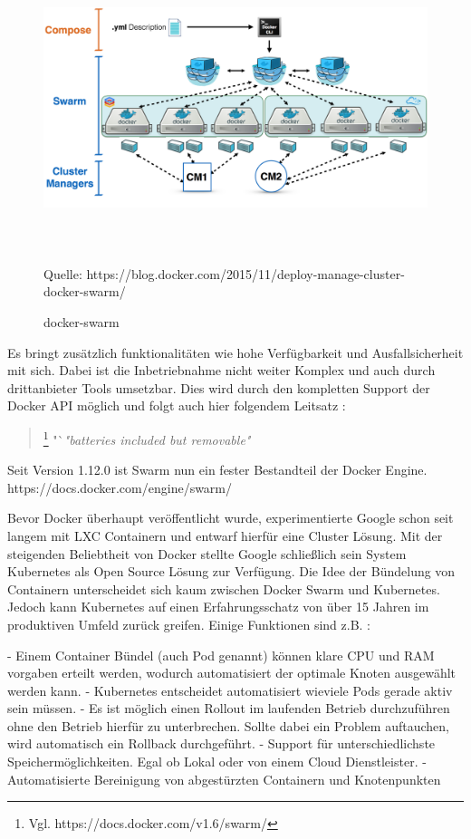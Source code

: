 \documentclass[12pt,toc=bib,toc=listof]{scrreprt}
\begin{document}
\begin{figure}
	\centering
	\caption{docker-swarm}
	\includegraphics[width=15cm, height=9cm, scale=0.3]{docker-swarm.png}
	Quelle: https://blog.docker.com/2015/11/deploy-manage-cluster-docker-swarm/
\end{figure}

Es bringt zusätzlich funktionalitäten wie hohe Verfügbarkeit und Ausfallsicherheit mit sich.
Dabei ist die Inbetriebnahme nicht weiter Komplex und auch durch drittanbieter Tools umsetzbar.
Dies wird durch den kompletten Support der Docker API möglich und folgt auch hier folgendem Leitsatz :

\begin{quote}
	\footnote[1]{Vgl. https://docs.docker.com/v1.6/swarm/}
	"`\textit{"batteries included but removable"}
\end{quote}

Seit Version 1.12.0 ist Swarm nun ein fester Bestandteil der Docker Engine.
https://docs.docker.com/engine/swarm/

Bevor Docker überhaupt veröffentlicht wurde, experimentierte Google schon seit langem mit LXC Containern und entwarf hierfür eine Cluster Lösung.
Mit der steigenden Beliebtheit von Docker stellte Google schließlich sein System Kubernetes als Open Source Lösung zur Verfügung.
Die Idee der Bündelung von Containern unterscheidet sich kaum zwischen Docker Swarm und Kubernetes.
Jedoch kann Kubernetes auf einen Erfahrungsschatz von über 15 Jahren im produktiven Umfeld zurück greifen.
Einige Funktionen sind z.B. :

- Einem Container Bündel (auch Pod genannt) können klare CPU und RAM vorgaben erteilt werden, wodurch automatisiert der optimale Knoten ausgewählt werden kann.
- Kubernetes entscheidet automatisiert wieviele Pods gerade aktiv sein müssen.
- Es ist möglich einen Rollout im laufenden Betrieb durchzuführen ohne den Betrieb hierfür zu unterbrechen. Sollte dabei ein Problem auftauchen, wird automatisch ein Rollback durchgeführt.
- Support für unterschiedlichste Speichermöglichkeiten. Egal ob Lokal oder von einem Cloud Dienstleister.
- Automatisierte Bereinigung von abgestürzten Containern und Knotenpunkten
\end{document}
